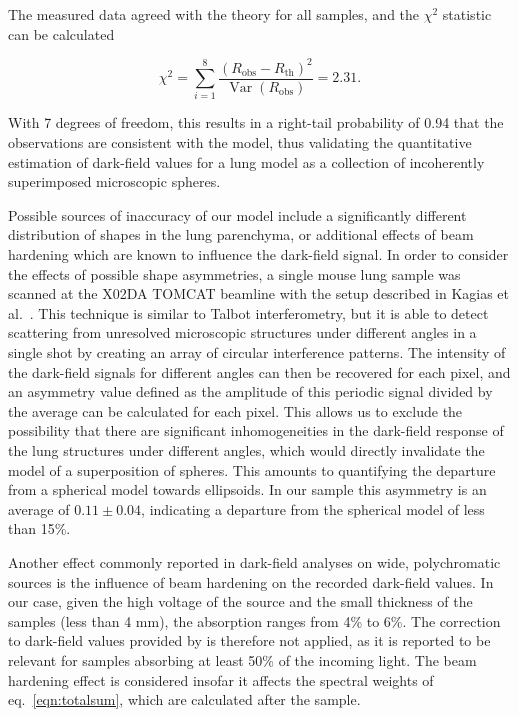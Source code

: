 
The measured data agreed with the
theory for all samples, and the $\chi^2$ statistic can be calculated

\begin{equation}
    \chi^2 = \sum_{i=1}^8 \dfrac{(R_{\text{obs}} -
    R_{\text{th}})^2}{\mathop{\mathrm{Var}}(R_{\text{obs}})} = 2.31.
    \label{eqn:chisq}
\end{equation}

With 7 degrees of freedom, this results in a right-tail probability of 0.94 that the 
observations are consistent with the model, thus validating the quantitative estimation of
dark-field values for a lung model as a collection of incoherently
superimposed microscopic spheres.

Possible sources of inaccuracy of our model include a significantly
different distribution of shapes in the lung parenchyma, or additional
effects of beam hardening which are known to influence the dark-field
signal. In order to consider the effects of possible shape asymmetries, a
single mouse lung sample was scanned at the X02DA TOMCAT beamline with the
setup described in Kagias et al.~\cite{PhysRevLett.116.093902}. This
technique is similar to Talbot interferometry, but it is able to detect
scattering from unresolved microscopic structures under different angles in
a single shot by
creating an array of circular interference patterns. The intensity of the
dark-field signals for different angles can then be recovered for each
pixel, and an asymmetry value defined as the amplitude of this periodic
signal divided by the average can be calculated for each pixel. This allows
us to exclude the possibility that there are significant inhomogeneities in
the dark-field response of the lung structures under different angles, which
would directly invalidate the model of a superposition of spheres. This
amounts to quantifying the departure from a spherical model towards
ellipsoids. In our sample this asymmetry is an average of $0.11 \pm 0.04$, indicating a departure from the spherical model of less than 15\%.

Another effect commonly reported in dark-field analyses on wide, polychromatic
sources is the influence of beam hardening on the recorded dark-field
values. In our case, given the high voltage of the source and the small
thickness of the samples (less than 4 mm), the absorption ranges from 4\% to
6\%. The correction to dark-field values provided by is therefore
not applied, as it is reported to be relevant for samples absorbing at least
50\% of the incoming light. The beam hardening effect is considered insofar
it affects the spectral weights of eq.~\ref{eqn:totalsum}, which are calculated
after the sample.

